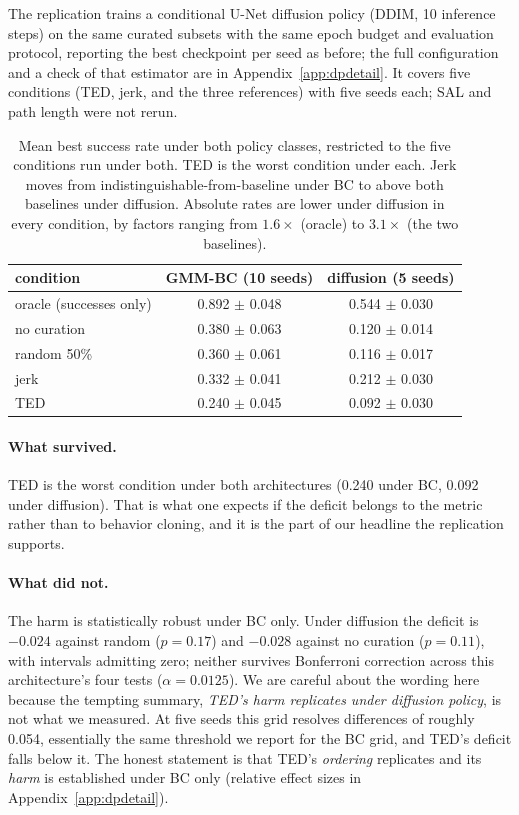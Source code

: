 \documentclass[10pt]{article}
\begin{document}
The replication trains a conditional U-Net diffusion policy (DDIM, 10
inference steps) on the same curated subsets with the same epoch budget and
evaluation protocol, reporting the best checkpoint per seed as before; the
full configuration and a check of that estimator are in
Appendix~\ref{app:dpdetail}. It covers five conditions (TED, jerk, and the
three references) with five seeds each; SAL and path length were not rerun.

\begin{table}[t]
\centering
\small
\begin{tabular}{lcc}
\toprule
condition & GMM-BC (10 seeds) & diffusion (5 seeds) \\
\midrule
oracle (successes only) & 0.892 $\pm$ 0.048 & 0.544 $\pm$ 0.030 \\
\midrule
no curation             & 0.380 $\pm$ 0.063 & 0.120 $\pm$ 0.014 \\
random 50\%             & 0.360 $\pm$ 0.061 & 0.116 $\pm$ 0.017 \\
\midrule
jerk                    & 0.332 $\pm$ 0.041 & 0.212 $\pm$ 0.030 \\
TED                     & 0.240 $\pm$ 0.045 & 0.092 $\pm$ 0.030 \\
\bottomrule
\end{tabular}
\caption{Mean best success rate under both policy classes, restricted to the
five conditions run under both. TED is the worst condition under each. Jerk
moves from indistinguishable-from-baseline under BC to above both baselines
under diffusion. Absolute rates are lower under diffusion in every
condition, by factors ranging from $1.6\times$ (oracle) to $3.1\times$ (the
two baselines).}
\label{tab:crossarch}
\end{table}

\paragraph{What survived.} TED is the worst condition under both
architectures (0.240 under BC, 0.092 under diffusion). That is what one
expects if the deficit belongs to the metric rather than to behavior
cloning, and it is the part of our headline the replication supports.

\paragraph{What did not.} The harm is statistically robust under BC only.
Under diffusion the deficit is $-0.024$ against random ($p = 0.17$) and
$-0.028$ against no curation ($p = 0.11$), with intervals admitting zero;
neither survives Bonferroni correction across this architecture's four
tests ($\alpha = 0.0125$).
We are careful about the wording here because the tempting summary,
\emph{TED's harm replicates under diffusion policy}, is not what we
measured. At five seeds this grid resolves differences of roughly 0.054,
essentially the same threshold we report for the BC grid, and TED's deficit
falls below it. The honest statement is that TED's \emph{ordering}
replicates and its \emph{harm} is established under BC only
(relative effect sizes in Appendix~\ref{app:dpdetail}).
\end{document}
